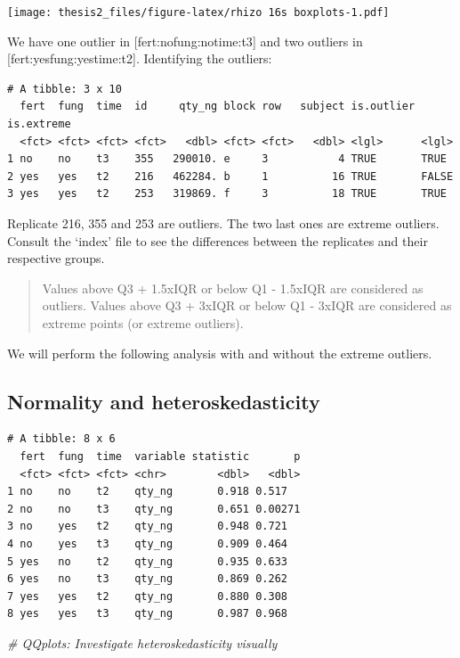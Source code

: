 \documentclass[twoside,12pt,final]{ucthesis-CA2012}
\newenvironment{Shaded}{}{}
\newcommand{\KeywordTok}[1]{\textcolor[rgb]{0.00,0.44,0.13}{\textbf{{#1}}}}
\newcommand{\StringTok}[1]{\textcolor[rgb]{0.25,0.44,0.63}{{#1}}}
\newcommand{\CommentTok}[1]{\textcolor[rgb]{0.38,0.63,0.69}{\textit{{#1}}}}
\newcommand{\NormalTok}[1]{{#1}}
\newcommand{\OperatorTok}[1]{\textcolor[rgb]{0.00,0.44,0.13}{\textbf{{#1}}}}
\begin{document}
\begin{ucmainmatter}
\texttt{[image: thesis2\_files/figure-latex/rhizo 16s boxplots-1.pdf]}

We have one outlier in {[}fert:no\textbar fung:no\textbar time:t3{]} and two outliers in {[}fert:yes\textbar fung:yes\textbar time:t2{]}. Identifying the outliers:
\begin{verbatim}
# A tibble: 3 x 10
  fert  fung  time  id     qty_ng block row   subject is.outlier is.extreme
  <fct> <fct> <fct> <fct>   <dbl> <fct> <fct>   <dbl> <lgl>      <lgl>     
1 no    no    t3    355   290010. e     3           4 TRUE       TRUE      
2 yes   yes   t2    216   462284. b     1          16 TRUE       FALSE     
3 yes   yes   t2    253   319869. f     3          18 TRUE       TRUE      
\end{verbatim}
Replicate 216, 355 and 253 are outliers. The two last ones are extreme outliers. Consult the `index' file to see the differences between the replicates and their respective groups.
\begin{quote}
Values above Q3 + 1.5xIQR or below Q1 - 1.5xIQR are considered as outliers. Values above Q3 + 3xIQR or below Q1 - 3xIQR are considered as extreme points (or extreme outliers).
\end{quote}
We will perform the following analysis with and without the extreme outliers.

\hypertarget{normality-and-heteroskedasticity}{%
\subsection{Normality and heteroskedasticity}\label{normality-and-heteroskedasticity}}
\begin{Shaded}
\end{Shaded}
\begin{verbatim}
# A tibble: 8 x 6
  fert  fung  time  variable statistic       p
  <fct> <fct> <fct> <chr>        <dbl>   <dbl>
1 no    no    t2    qty_ng       0.918 0.517  
2 no    no    t3    qty_ng       0.651 0.00271
3 no    yes   t2    qty_ng       0.948 0.721  
4 no    yes   t3    qty_ng       0.909 0.464  
5 yes   no    t2    qty_ng       0.935 0.633  
6 yes   no    t3    qty_ng       0.869 0.262  
7 yes   yes   t2    qty_ng       0.880 0.308  
8 yes   yes   t3    qty_ng       0.987 0.968  
\end{verbatim}
\begin{Shaded}
\begin{Highlighting}[]
\CommentTok{# QQplots: Investigate heteroskedasticity visually }


\end{Highlighting}
\end{Shaded}
\end{ucmainmatter}
\end{document}
